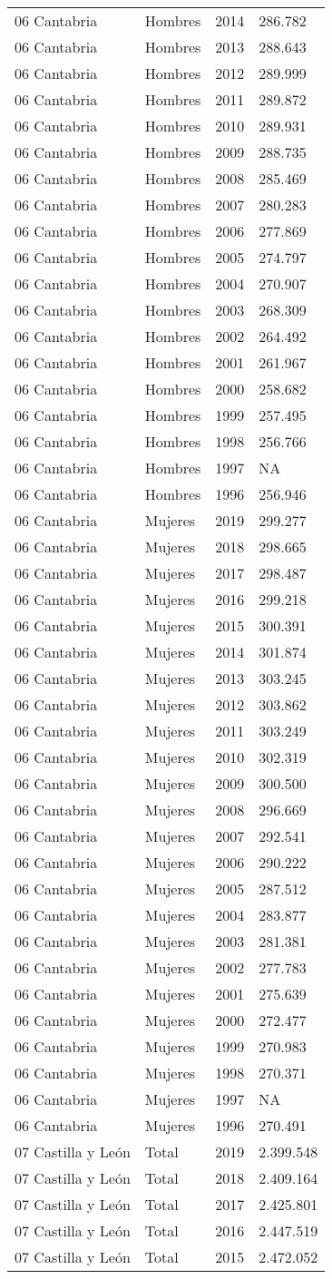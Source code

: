 \documentclass[
]{article}
\begin{document}
\begin{longtable}[]{@{}llrl@{}}
06 Cantabria & Hombres & 2014 & 286.782\tabularnewline
06 Cantabria & Hombres & 2013 & 288.643\tabularnewline
06 Cantabria & Hombres & 2012 & 289.999\tabularnewline
06 Cantabria & Hombres & 2011 & 289.872\tabularnewline
06 Cantabria & Hombres & 2010 & 289.931\tabularnewline
06 Cantabria & Hombres & 2009 & 288.735\tabularnewline
06 Cantabria & Hombres & 2008 & 285.469\tabularnewline
06 Cantabria & Hombres & 2007 & 280.283\tabularnewline
06 Cantabria & Hombres & 2006 & 277.869\tabularnewline
06 Cantabria & Hombres & 2005 & 274.797\tabularnewline
06 Cantabria & Hombres & 2004 & 270.907\tabularnewline
06 Cantabria & Hombres & 2003 & 268.309\tabularnewline
06 Cantabria & Hombres & 2002 & 264.492\tabularnewline
06 Cantabria & Hombres & 2001 & 261.967\tabularnewline
06 Cantabria & Hombres & 2000 & 258.682\tabularnewline
06 Cantabria & Hombres & 1999 & 257.495\tabularnewline
06 Cantabria & Hombres & 1998 & 256.766\tabularnewline
06 Cantabria & Hombres & 1997 & NA\tabularnewline
06 Cantabria & Hombres & 1996 & 256.946\tabularnewline
06 Cantabria & Mujeres & 2019 & 299.277\tabularnewline
06 Cantabria & Mujeres & 2018 & 298.665\tabularnewline
06 Cantabria & Mujeres & 2017 & 298.487\tabularnewline
06 Cantabria & Mujeres & 2016 & 299.218\tabularnewline
06 Cantabria & Mujeres & 2015 & 300.391\tabularnewline
06 Cantabria & Mujeres & 2014 & 301.874\tabularnewline
06 Cantabria & Mujeres & 2013 & 303.245\tabularnewline
06 Cantabria & Mujeres & 2012 & 303.862\tabularnewline
06 Cantabria & Mujeres & 2011 & 303.249\tabularnewline
06 Cantabria & Mujeres & 2010 & 302.319\tabularnewline
06 Cantabria & Mujeres & 2009 & 300.500\tabularnewline
06 Cantabria & Mujeres & 2008 & 296.669\tabularnewline
06 Cantabria & Mujeres & 2007 & 292.541\tabularnewline
06 Cantabria & Mujeres & 2006 & 290.222\tabularnewline
06 Cantabria & Mujeres & 2005 & 287.512\tabularnewline
06 Cantabria & Mujeres & 2004 & 283.877\tabularnewline
06 Cantabria & Mujeres & 2003 & 281.381\tabularnewline
06 Cantabria & Mujeres & 2002 & 277.783\tabularnewline
06 Cantabria & Mujeres & 2001 & 275.639\tabularnewline
06 Cantabria & Mujeres & 2000 & 272.477\tabularnewline
06 Cantabria & Mujeres & 1999 & 270.983\tabularnewline
06 Cantabria & Mujeres & 1998 & 270.371\tabularnewline
06 Cantabria & Mujeres & 1997 & NA\tabularnewline
06 Cantabria & Mujeres & 1996 & 270.491\tabularnewline
07 Castilla y León & Total & 2019 & 2.399.548\tabularnewline
07 Castilla y León & Total & 2018 & 2.409.164\tabularnewline
07 Castilla y León & Total & 2017 & 2.425.801\tabularnewline
07 Castilla y León & Total & 2016 & 2.447.519\tabularnewline
07 Castilla y León & Total & 2015 & 2.472.052\tabularnewline

\end{longtable}
\end{document}

